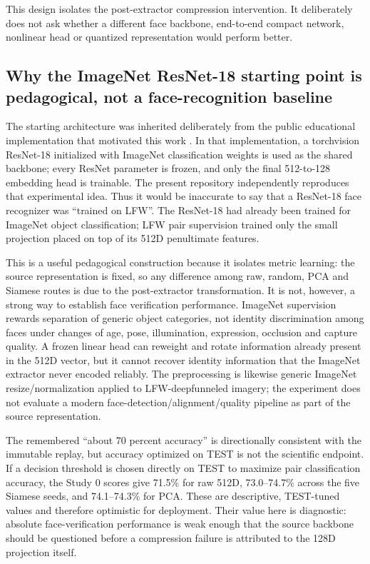 \documentclass[10pt,a4paper]{article}
\begin{document}
This design isolates the post-extractor compression intervention. It deliberately does not
ask whether a different face backbone, end-to-end compact network, nonlinear head or
quantized representation would perform better.

\subsection{Why the ImageNet ResNet-18 starting point is pedagogical, not a face-recognition baseline}\label{sec:backbone-provenance}

The starting architecture was inherited deliberately from the public educational
implementation that motivated this work \cite{diazcano2026}. In that implementation, a
torchvision ResNet-18 initialized with ImageNet classification weights is used as the shared
backbone; every ResNet parameter is frozen, and only the final 512-to-128 embedding head is
trainable. The present repository independently reproduces that experimental idea. Thus it
would be inaccurate to say that a ResNet-18 face recognizer was ``trained on LFW''. The
ResNet-18 had already been trained for ImageNet object classification; LFW pair supervision
trained only the small projection placed on top of its 512D penultimate features.

This is a useful pedagogical construction because it isolates metric learning: the source
representation is fixed, so any difference among raw, random, PCA and Siamese routes is due
to the post-extractor transformation. It is not, however, a strong way to establish face
verification performance. ImageNet supervision rewards separation of generic object
categories, not identity discrimination among faces under changes of age, pose,
illumination, expression, occlusion and capture quality. A frozen linear head can reweight
and rotate information already present in the 512D vector, but it cannot recover identity
information that the ImageNet extractor never encoded reliably. The preprocessing is
likewise generic ImageNet resize/normalization applied to LFW-deepfunneled imagery; the
experiment does not evaluate a modern face-detection/alignment/quality pipeline as part of
the source representation.

The remembered ``about 70 percent accuracy'' is directionally consistent with the immutable
replay, but accuracy optimized on TEST is not the scientific endpoint. If a decision
threshold is chosen directly on TEST to maximize pair classification accuracy, the Study 0
scores give 71.5\% for raw 512D, 73.0--74.7\% across the five Siamese seeds, and
74.1--74.3\% for PCA. These are descriptive, TEST-tuned values and therefore optimistic for
deployment. Their value here is diagnostic: absolute face-verification performance is weak
enough that the source backbone should be questioned before a compression failure is
attributed to the 128D projection itself.
\end{document}
